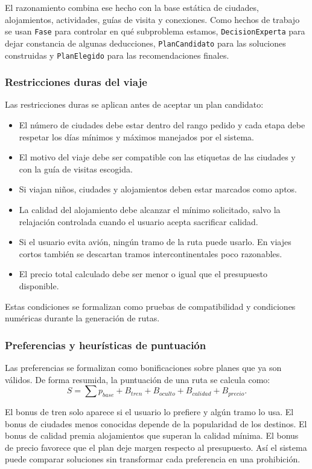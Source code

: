 \documentclass[11pt,a4paper]{article}
\begin{document}
El razonamiento combina ese hecho con la base est\'atica de ciudades,
alojamientos, actividades, gu\'ias de visita y conexiones. Como hechos de
trabajo se usan \texttt{Fase} para controlar en qu\'e subproblema estamos,
\texttt{DecisionExperta} para dejar constancia de algunas deducciones,
\texttt{PlanCandidato} para las soluciones construidas y
\texttt{PlanElegido} para las recomendaciones finales.

\subsubsection{Restricciones duras del viaje}
Las restricciones duras se aplican antes de aceptar un plan candidato:
\begin{itemize}
    \item El n\'umero de ciudades debe estar dentro del rango pedido y cada
    etapa debe respetar los d\'ias m\'inimos y m\'aximos manejados por el
    sistema.
    \item El motivo del viaje debe ser compatible con las etiquetas de las
    ciudades y con la gu\'ia de visitas escogida.
    \item Si viajan ni\~nos, ciudades y alojamientos deben estar marcados como
    aptos.
    \item La calidad del alojamiento debe alcanzar el m\'inimo solicitado,
    salvo la relajaci\'on controlada cuando el usuario acepta sacrificar
    calidad.
    \item Si el usuario evita avi\'on, ning\'un tramo de la ruta puede usarlo.
    En viajes cortos tambi\'en se descartan tramos intercontinentales poco
    razonables.
    \item El precio total calculado debe ser menor o igual que el presupuesto
    disponible.
\end{itemize}

Estas condiciones se formalizan como pruebas de compatibilidad y condiciones
num\'ericas durante la generaci\'on de rutas.

\subsubsection{Preferencias y heur\'isticas de puntuaci\'on}
Las preferencias se formalizan como bonificaciones sobre planes que ya son
v\'alidos. De forma resumida, la puntuaci\'on de una ruta se calcula como:
\[
    S = \sum p_{base} + B_{tren} + B_{oculto} + B_{calidad} + B_{precio}.
\]

El bonus de tren solo aparece si el usuario lo prefiere y alg\'un tramo lo usa.
El bonus de ciudades menos conocidas depende de la popularidad de los destinos.
El bonus de calidad premia alojamientos que superan la calidad m\'inima. El
bonus de precio favorece que el plan deje margen respecto al presupuesto. As\'i
el sistema puede comparar soluciones sin transformar cada preferencia en una
prohibici\'on.
\end{document}
